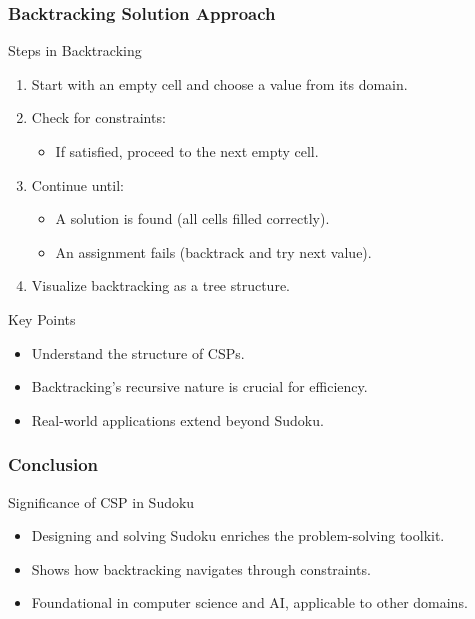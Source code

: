 \documentclass[aspectratio=169]{beamer}
\begin{document}
\begin{frame}[fragile]
    \frametitle{Backtracking Solution Approach}
    \begin{block}{Steps in Backtracking}
        \begin{enumerate}
            \item Start with an empty cell and choose a value from its domain.
            \item Check for constraints:
                \begin{itemize}
                    \item If satisfied, proceed to the next empty cell.
                \end{itemize}
            \item Continue until:
                \begin{itemize}
                    \item A solution is found (all cells filled correctly).
                    \item An assignment fails (backtrack and try next value).
                \end{itemize}
            \item Visualize backtracking as a tree structure.
        \end{enumerate}
    \end{block}

    \begin{block}{Key Points}
        \begin{itemize}
            \item Understand the structure of CSPs.
            \item Backtracking's recursive nature is crucial for efficiency.
            \item Real-world applications extend beyond Sudoku.
        \end{itemize}
    \end{block}
\end{frame}

\begin{frame}[fragile]
    \frametitle{Conclusion}
    \begin{block}{Significance of CSP in Sudoku}
        \begin{itemize}
            \item Designing and solving Sudoku enriches the problem-solving toolkit.
            \item Shows how backtracking navigates through constraints.
            \item Foundational in computer science and AI, applicable to other domains.
        \end{itemize}
    \end{block}
\end{frame}
\end{document}
